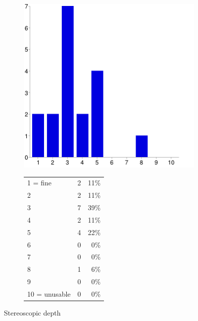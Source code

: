 \documentclass[MSc,paper=a4,pagesize=auto]{icldt}
\begin{document}
\begin{figure}[htbp!]
\centering
\begin{subfigure}{0.4\textwidth}
    \centering
    \includegraphics[width=1\linewidth]{resources/13-stereoscopic_depth}
\end{subfigure}%
\centering
\begin{subfigure}{0.5\textwidth}
    \centering
   	\begin{tabular}{ l c r }
1 = fine&2&11\% \\
2&2&11\% \\
3&7&39\% \\
4&2&11\% \\
5&4&22\% \\
6&0&0\% \\
7&0&0\% \\
8&1&6\% \\
9&0&0\% \\
10 = unusable&0&0\% \\
\end{tabular}
\end{subfigure} 
    \caption{Stereoscopic depth}
    \label{fig:13-stereoscopic_depth}
\end{figure}
\end{document}
